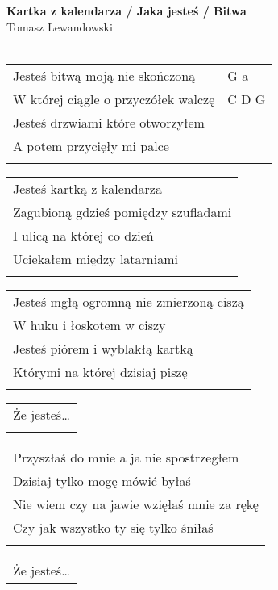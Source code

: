 \documentclass[a5paper]{article}
\begin{document}


\noindent
\fontsize{12pt}{15pt}\selectfont
\textbf{Kartka z kalendarza / Jaka jesteś / Bitwa} \\
\fontsize{8pt}{10pt}\selectfont
Tomasz Lewandowski \\ \\
\fontsize{10pt}{12pt}\selectfont
{}
\noindent
\begin{tabular}{@{}p{8.5cm}p{3cm}@{}}
Jesteś bitwą moją nie skończoną & G a \\
W której ciągle o przyczółek walczę & C D G \\
Jesteś drzwiami które otworzyłem & \\
A potem przycięły mi palce & \\ \\
\end{tabular}

\noindent
\begin{tabular}{@{}p{8.5cm}@{}}
Jesteś kartką z kalendarza \\
Zagubioną gdzieś pomiędzy szufladami \\
I ulicą na której co dzień \\
Uciekałem między latarniami \\ \\
\end{tabular}

\noindent
\begin{tabular}{@{}p{9.5cm}@{}}
Jesteś mgłą ogromną nie zmierzoną ciszą \\
W huku i łoskotem w ciszy \\
Jesteś piórem i wyblakłą kartką \\
Którymi na której dzisiaj piszę \\ \\
\end{tabular}

\noindent
\begin{tabular}{@{}p{8.5cm}@{}}
Że jesteś… \\ \\
\end{tabular}

\noindent
\begin{tabular}{@{}p{9.5cm}@{}}
Przyszłaś do mnie a ja nie spostrzegłem \\
Dzisiaj tylko mogę mówić byłaś \\
Nie wiem czy na jawie wzięłaś mnie za rękę \\
Czy jak wszystko ty się tylko śniłaś \\ \\
\end{tabular}

\noindent
\begin{tabular}{@{}p{8.5cm}@{}}
Że jesteś…
\end{tabular}
\end{document}
